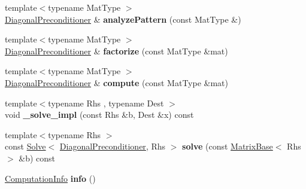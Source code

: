 \begin{DoxyCompactItemize}
{\footnotesize template$<$typename Mat\+Type $>$ }\\\hyperlink{group___iterative_linear_solvers___module_class_eigen_1_1_diagonal_preconditioner}{Diagonal\+Preconditioner} \& {\bfseries analyze\+Pattern} (const Mat\+Type \&)
\item 
\mbox{\label{group___iterative_linear_solvers___module_a3bb1bae9f49ff115fb21f951101fb88a}} 
{\footnotesize template$<$typename Mat\+Type $>$ }\\\hyperlink{group___iterative_linear_solvers___module_class_eigen_1_1_diagonal_preconditioner}{Diagonal\+Preconditioner} \& {\bfseries factorize} (const Mat\+Type \&mat)
\item 
\mbox{\label{group___iterative_linear_solvers___module_a4b938c483a6d17bfc079f2fde8671a08}} 
{\footnotesize template$<$typename Mat\+Type $>$ }\\\hyperlink{group___iterative_linear_solvers___module_class_eigen_1_1_diagonal_preconditioner}{Diagonal\+Preconditioner} \& {\bfseries compute} (const Mat\+Type \&mat)
\item 
\mbox{\label{group___iterative_linear_solvers___module_a3bbc5d91d64e3968c3b0b629e15e9fb7}} 
{\footnotesize template$<$typename Rhs , typename Dest $>$ }\\void {\bfseries \+\_\+solve\+\_\+impl} (const Rhs \&b, Dest \&x) const
\item 
\mbox{\label{group___iterative_linear_solvers___module_a0b42a9d87d619347f92f703f162f375f}} 
{\footnotesize template$<$typename Rhs $>$ }\\const \hyperlink{group___core___module_class_eigen_1_1_solve}{Solve}$<$ \hyperlink{group___iterative_linear_solvers___module_class_eigen_1_1_diagonal_preconditioner}{Diagonal\+Preconditioner}, Rhs $>$ {\bfseries solve} (const \hyperlink{group___core___module_class_eigen_1_1_matrix_base}{Matrix\+Base}$<$ Rhs $>$ \&b) const
\item 
\mbox{\label{group___iterative_linear_solvers___module_a83769941faa301e9f414ecdf6a715140}} 
\hyperlink{group__enums_ga85fad7b87587764e5cf6b513a9e0ee5e}{Computation\+Info} {\bfseries info} ()
\end{DoxyCompactItemize}
